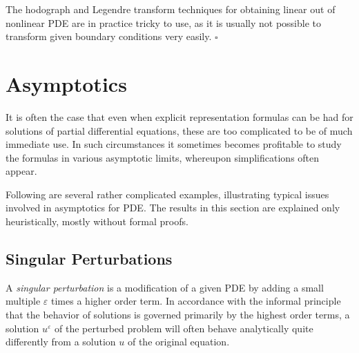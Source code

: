 \begin{remark}
\label{rem:hodograph-legendre-practical-difficulty}
The hodograph and Legendre transform techniques for obtaining linear out of nonlinear PDE are in practice tricky to use, as it is usually not possible to transform given boundary conditions very easily. $\square$
\end{remark}

\section{Asymptotics}
\label{sec:asymptotics}

It is often the case that even when explicit representation formulas can be had for solutions of partial differential equations, these are too complicated to be of much immediate use. In such circumstances it sometimes becomes profitable to study the formulas in various asymptotic limits, whereupon simplifications often appear.

Following are several rather complicated examples, illustrating typical issues involved in asymptotics for PDE. The results in this section are explained only heuristically, mostly without formal proofs.

\subsection{Singular Perturbations}
\label{sec:singular-perturbations}

\begin{definition}
\label{def:singular-perturbation}
A \textit{singular perturbation} is a modification of a given PDE by adding a small multiple $\varepsilon$ times a higher order term. In accordance with the informal principle that the behavior of solutions is governed primarily by the highest order terms, a solution $u^\varepsilon$ of the perturbed problem will often behave analytically quite differently from a solution $u$ of the original equation.
\end{definition}

